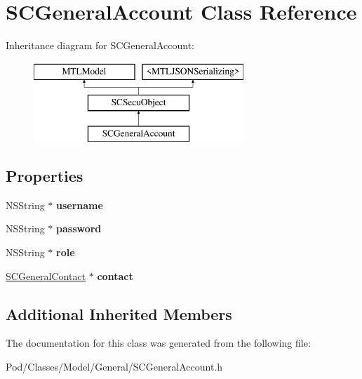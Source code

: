 \hypertarget{interface_s_c_general_account}{}\section{S\+C\+General\+Account Class Reference}
\label{interface_s_c_general_account}
Inheritance diagram for S\+C\+General\+Account\+:\begin{figure}[H]
\begin{center}
\leavevmode
\includegraphics[height=3.000000cm]{interface_s_c_general_account}
\end{center}
\end{figure}
\subsection*{Properties}
\begin{DoxyCompactItemize}
\item 
N\+S\+String $\ast$ {\bfseries username}\hypertarget{interface_s_c_general_account_ad826a767bc336bde7ad2008c43f06116}{}\label{interface_s_c_general_account_ad826a767bc336bde7ad2008c43f06116}

\item 
N\+S\+String $\ast$ {\bfseries password}\hypertarget{interface_s_c_general_account_aa1065c5c1ef6f40e3e66ef3f702a5a2c}{}\label{interface_s_c_general_account_aa1065c5c1ef6f40e3e66ef3f702a5a2c}

\item 
N\+S\+String $\ast$ {\bfseries role}\hypertarget{interface_s_c_general_account_abf8514fa23699689bf55e14e02a55403}{}\label{interface_s_c_general_account_abf8514fa23699689bf55e14e02a55403}

\item 
\hyperlink{interface_s_c_general_contact}{S\+C\+General\+Contact} $\ast$ {\bfseries contact}\hypertarget{interface_s_c_general_account_a1eaf3c40c06469f236c590a1cf79cdd8}{}\label{interface_s_c_general_account_a1eaf3c40c06469f236c590a1cf79cdd8}

\end{DoxyCompactItemize}
\subsection*{Additional Inherited Members}


The documentation for this class was generated from the following file\+:\begin{DoxyCompactItemize}
\item 
Pod/\+Classes/\+Model/\+General/S\+C\+General\+Account.\+h\end{DoxyCompactItemize}
